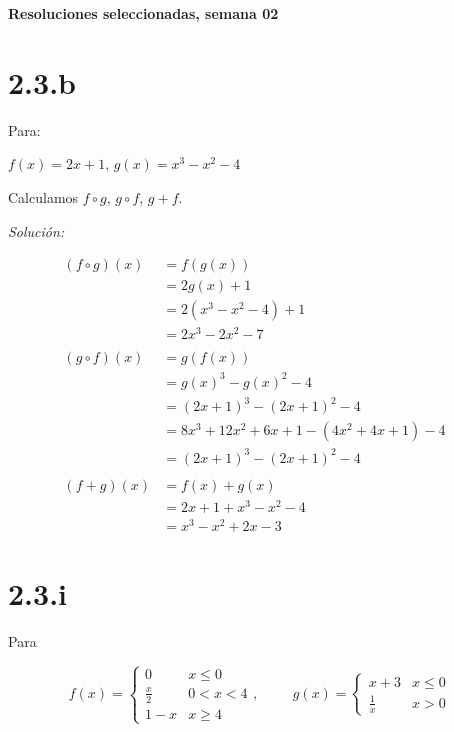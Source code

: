 \documentclass[10pt,a4paper]{article}
\renewcommand{\o}{\circ}
\begin{document}
\vspace{0,3cm}

\begin{center}
{\bf \Large Resoluciones seleccionadas, semana 02}
\end{center}

\vspace{0,3cm}

\section*{2.3.b}


\noindent
Para:

$ f(x) = 2x + 1$, \hspace{2cm} $g(x) = x^{3} - x^{2} - 4 $

\noindent
Calculamos $f \o g$, $g \o f$, $g + f$.


\noindent
\emph{Solución:}

\begin{align*}
  (f \o g)(x)
  &= f(g (x)) &\\
  &= 2g(x)+1 &\\
  &= 2 (x^3-x^2-4)+1 &\\
  &= 2x^3-2x^2-7 &\\ \\
  (g \o f)(x)
  &= g (f (x)) &\\
  &= g(x)^3-g(x)^2-4 &\\
  &= (2x+1)^3-(2x+1)^2-4 &\\
  &= 8 x^3 + 12 x^2 + 6 x + 1 - (4 x^2 + 4 x + 1) - 4 &\\
  &= (2x+1)^3-(2x+1)^2-4 & \\ \\
  (f + g) (x)
  &= f(x) + g (x) &\\
  &= 2x + 1 + x^3 - x^2 - 4 &\\
  &= x^3 - x^2 + 2x -3&
\end{align*}




\section*{2.3.i}


\noindent
Para

$$f(x) = \left \{ \begin{matrix} 0 & x \leq 0
\\ \frac{x}{2} & 0 < x < 4 
\\ 1- x & x \geq 4 \end{matrix}\right. , \hspace{1cm}
g(x) = \left \{ \begin{matrix} x +3 & x \leq 0
\\  \frac{1}{x} & x > 0 \end{matrix}\right.$$
\end{document}
